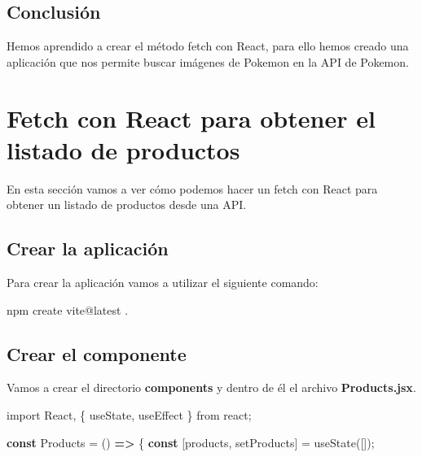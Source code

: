 \documentclass[
  a4paper,
  DIV=11,
  numbers=noendperiod,
  onepage,
  openany]{scrreprt}
\newenvironment{Shaded}{\begin{snugshade}}{\end{snugshade}}
\newcommand{\ExtensionTok}[1]{\textcolor[rgb]{0.00,0.23,0.31}{#1}}
\newcommand{\FunctionTok}[1]{\textcolor[rgb]{0.28,0.35,0.67}{#1}}
\newcommand{\ImportTok}[1]{\textcolor[rgb]{0.00,0.46,0.62}{#1}}
\newcommand{\KeywordTok}[1]{\textcolor[rgb]{0.00,0.23,0.31}{\textbf{#1}}}
\newcommand{\NormalTok}[1]{\textcolor[rgb]{0.00,0.23,0.31}{#1}}
\newcommand{\OperatorTok}[1]{\textcolor[rgb]{0.37,0.37,0.37}{#1}}
\newcommand{\StringTok}[1]{\textcolor[rgb]{0.13,0.47,0.30}{#1}}
\begin{document}
\begin{tcolorbox}
\section{Conclusión}\label{conclusiuxf3n-4}

Hemos aprendido a crear el método fetch con React, para ello hemos
creado una aplicación que nos permite buscar imágenes de Pokemon en la
API de Pokemon.

\chapter{Fetch con React para obtener el listado de
productos}\label{fetch-con-react-para-obtener-el-listado-de-productos}

En esta sección vamos a ver cómo podemos hacer un fetch con React para
obtener un listado de productos desde una API.

\section{Crear la aplicación}\label{crear-la-aplicaciuxf3n-2}

Para crear la aplicación vamos a utilizar el siguiente comando:

\begin{Shaded}
\begin{Highlighting}[]
\ExtensionTok{npm}\NormalTok{ create vite@latest .}
\end{Highlighting}
\end{Shaded}

\section{Crear el componente}\label{crear-el-componente-1}

Vamos a crear el directorio \textbf{components} y dentro de él el
archivo \textbf{Products.jsx}.

\begin{Shaded}
\begin{Highlighting}[]
\ImportTok{import}\NormalTok{ React}\OperatorTok{,}\NormalTok{ \{ useState}\OperatorTok{,}\NormalTok{ useEffect \} }\ImportTok{from} \StringTok{\textquotesingle{}react\textquotesingle{}}\OperatorTok{;}

\KeywordTok{const}\NormalTok{ Products }\OperatorTok{=}\NormalTok{ () }\KeywordTok{=\textgreater{}}\NormalTok{ \{}
  \KeywordTok{const}\NormalTok{ [products}\OperatorTok{,}\NormalTok{ setProducts] }\OperatorTok{=} \FunctionTok{useState}\NormalTok{([])}\OperatorTok{;}


\end{Highlighting}
\end{Shaded}
\end{tcolorbox}
\end{document}
